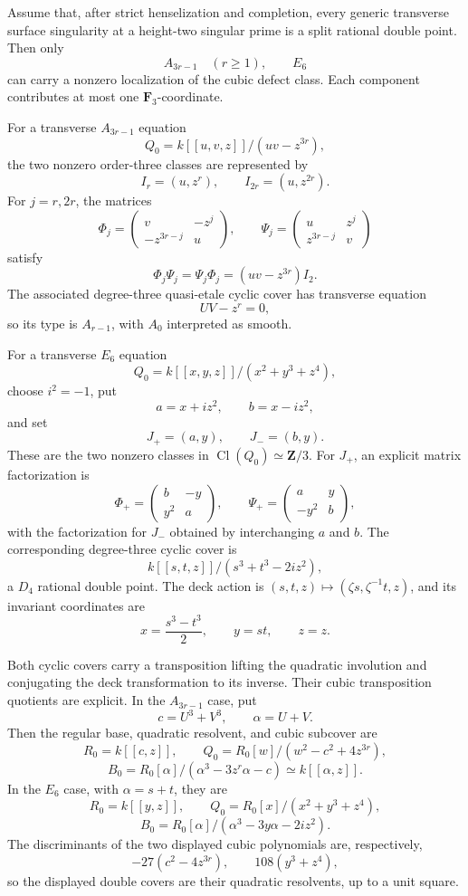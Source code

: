 \begin{proposition}
\label{prop:transverse-ADE-filter}
Assume that, after strict henselization and completion, every generic
transverse surface singularity at a height-two singular prime is a split
rational double point.  Then only
\[
A_{3r-1}\quad(r\ge1),\qquad E_6
\]
can carry a nonzero localization of the cubic defect class.  Each component
contributes at most one \(\mathbf F_3\)-coordinate.

For a transverse \(A_{3r-1}\) equation
\[
Q_0=k[[u,v,z]]/(uv-z^{3r}),
\]
the two nonzero order-three classes are represented by
\[
I_r=(u,z^r),\qquad I_{2r}=(u,z^{2r}).
\]
For \(j=r,2r\), the matrices
\[
\Phi_j=\begin{pmatrix}v&-z^j\\-z^{3r-j}&u\end{pmatrix},
\qquad
\Psi_j=\begin{pmatrix}u&z^j\\z^{3r-j}&v\end{pmatrix}
\]
satisfy
\[
\Phi_j\Psi_j=\Psi_j\Phi_j=(uv-z^{3r})I_2.
\]
The associated degree-three quasi-etale cyclic cover has transverse equation
\[
UV-z^r=0,
\]
so its type is \(A_{r-1}\), with \(A_0\) interpreted as smooth.

For a transverse \(E_6\) equation
\[
Q_0=k[[x,y,z]]/(x^2+y^3+z^4),
\]
choose \(i^2=-1\), put
\[
a=x+iz^2,\qquad b=x-iz^2,
\]
and set
\[
J_+=(a,y),\qquad J_-=(b,y).
\]
These are the two nonzero classes in \(\operatorname{Cl}(Q_0)\simeq\mathbf Z/3\).
For \(J_+\), an explicit matrix factorization is
\[
\Phi_+=\begin{pmatrix}b&-y\\y^2&a\end{pmatrix},
\qquad
\Psi_+=\begin{pmatrix}a&y\\-y^2&b\end{pmatrix},
\]
with the factorization for \(J_-\) obtained by interchanging \(a\) and \(b\).
The corresponding degree-three cyclic cover is
\[
k[[s,t,z]]/(s^3+t^3-2iz^2),
\]
a \(D_4\) rational double point.  The deck action is
\((s,t,z)\mapsto(\zeta s,\zeta^{-1}t,z)\), and its invariant coordinates are
\[
x=\frac{s^3-t^3}{2},\qquad y=st,\qquad z=z.
\]

Both cyclic covers carry a transposition lifting the quadratic involution and
conjugating the deck transformation to its inverse.  Their cubic
transposition quotients are explicit.  In the \(A_{3r-1}\) case, put
\[
c=U^3+V^3,\qquad \alpha=U+V.
\]
Then the regular base, quadratic resolvent, and cubic subcover are
\[
R_0=k[[c,z]],\qquad
Q_0=R_0[w]/(w^2-c^2+4z^{3r}),
\]
\[
B_0=R_0[\alpha]/(\alpha^3-3z^r\alpha-c)
    \simeq k[[\alpha,z]].
\]
In the \(E_6\) case, with \(\alpha=s+t\), they are
\[
R_0=k[[y,z]],\qquad
Q_0=R_0[x]/(x^2+y^3+z^4),
\]
\[
B_0=R_0[\alpha]/(\alpha^3-3y\alpha-2iz^2).
\]
The discriminants of the two displayed cubic polynomials are, respectively,
\[
-27(c^2-4z^{3r}),\qquad 108(y^3+z^4),
\]
so the displayed double covers are their quadratic resolvents, up to a unit
square.
\end{proposition}

